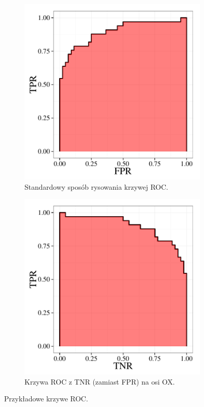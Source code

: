 \documentclass{mini}
\begin{document}
\begin{figure}[h]
  \begin{subfigure}[b]{0.4\textwidth}
    \includegraphics[width=\textwidth]{graphics/roc1.pdf}
    \caption{Standardowy sposób rysowania krzywej ROC.}
    \label{fig:f1}
  \end{subfigure}
  \hfill
  \begin{subfigure}[b]{0.4\textwidth}
    \includegraphics[width=\textwidth]{graphics/roc2.pdf}
    \caption{Krzywa ROC z TNR (zamiast FPR) na osi OX.}
    \label{fig:f2}
  \end{subfigure}
  \caption{Przykładowe krzywe ROC.}
  \label{krzyweroc}
\end{figure}
\end{document}
